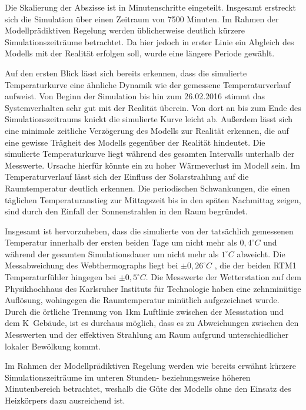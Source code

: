 Die Skalierung der Abszisse ist in Minutenschritte eingeteilt. Insgesamt erstreckt sich die Simulation über einen Zeitraum von 7500 Minuten. Im Rahmen der Modellprädiktiven Regelung werden üblicherweise deutlich kürzere Simulationszeiträume betrachtet. Da hier jedoch in erster Linie ein Abgleich des Modells mit der Realität erfolgen soll, wurde eine längere Periode gewählt.

Auf den ersten Blick lässt sich bereits erkennen, dass die simulierte Temperaturkurve eine ähnliche Dynamik wie der gemessene Temperaturverlauf aufweist. Von Beginn der Simulation bis hin zum 26.02.2016 stimmt das Systemverhalten sehr gut mit der Realität überein. Von dort an bis zum Ende des Simulationszeitraums knickt die simulierte Kurve leicht ab. 
Außerdem lässt sich eine minimale zeitliche Verzögerung des Modells zur Realität erkennen, die auf eine gewisse Trägheit des Modells gegenüber der Realität hindeutet.
Die simulierte Temperaturkurve liegt während des gesamten Intervalls unterhalb der Messwerte. Ursache hierfür könnte ein zu hoher Wärmeverlust im Modell sein.  
Im Temperaturverlauf lässt sich der Einfluss der Solarstrahlung auf die Raumtemperatur deutlich erkennen. Die periodischen Schwankungen, die einen täglichen Temperaturanstieg zur Mittagszeit bis in den späten Nachmittag zeigen, sind durch den Einfall der Sonnenstrahlen in den Raum begründet. 

Insgesamt ist hervorzuheben, dass die simulierte von der tatsächlich gemessenen Temperatur innerhalb der ersten beiden Tage um nicht mehr als $0,4^{\circ}C$ und während der gesamten Simulationsdauer um nicht mehr als $1^{\circ}C$ abweicht.
Die Messabweichung des Webthermographs liegt bei $\pm 0,26^{\circ}C$ , die der beiden RTM1 Temperaturfühler hingegen bei $\pm 0,5^{\circ}C$.
Die Messwerte der Wetterstation auf dem Physikhochhaus des Karlsruher Instituts für Technologie haben eine zehnminütige Auflösung, wohingegen die Raumtemperatur minütlich aufgezeichnet wurde.
Durch die örtliche Trennung von 1km Luftlinie zwischen der Messstation und dem K~Gebäude, ist es durchaus möglich, dass es zu Abweichungen zwischen den Messwerten und der effektiven Strahlung am Raum aufgrund unterschiedlicher lokaler Bewölkung kommt. 

Im Rahmen der Modellprädiktiven Regelung werden wie bereits erwähnt kürzere Simulationszeiträume im unteren Stunden- beziehungsweise höheren Minutenbereich betrachtet, weshalb die Güte des Modells ohne den Einsatz des Heizkörpers dazu ausreichend ist.

